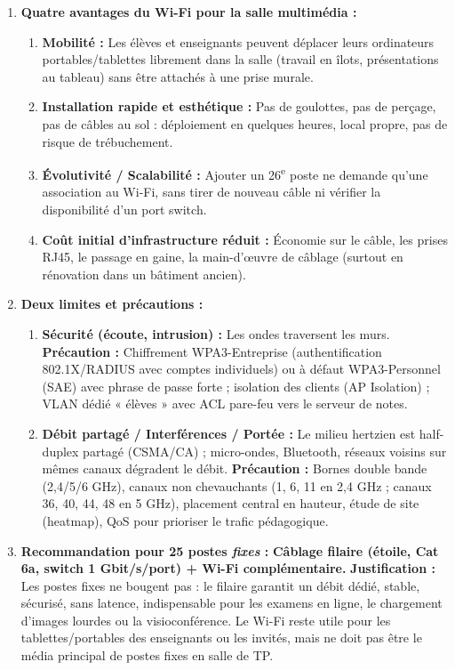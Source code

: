 \documentclass[11pt]{article}
\newcommand{\cle}[1]{{\popxbold\color{popdark}#1}}
\begin{document}
\begin{corrige}
\begin{enumerate}
  \item \textbf{Quatre avantages du Wi-Fi pour la salle multimédia :}
  \begin{enumerate}
    \item \textbf{Mobilité :} Les élèves et enseignants peuvent déplacer leurs ordinateurs portables/tablettes librement dans la salle (travail en îlots, présentations au tableau) sans être attachés à une prise murale.
    \item \textbf{Installation rapide et esthétique :} Pas de goulottes, pas de perçage, pas de câbles au sol : déploiement en quelques heures, local propre, pas de risque de trébuchement.
    \item \textbf{Évolutivité / Scalabilité :} Ajouter un 26\textsuperscript{e} poste ne demande qu'une association au Wi-Fi, sans tirer de nouveau câble ni vérifier la disponibilité d'un port switch.
    \item \textbf{Coût initial d'infrastructure réduit :} Économie sur le câble, les prises RJ45, le passage en gaine, la main-d'œuvre de câblage (surtout en rénovation dans un bâtiment ancien).
  \end{enumerate}
  \item \textbf{Deux limites et précautions :}
  \begin{enumerate}
    \item \textbf{Sécurité (écoute, intrusion) :} Les ondes traversent les murs. \textbf{Précaution :} Chiffrement \cle{WPA3-Entreprise} (authentification 802.1X/RADIUS avec comptes individuels) ou à défaut WPA3-Personnel (SAE) avec phrase de passe forte ; isolation des clients (AP Isolation) ; VLAN dédié « élèves » avec ACL pare-feu vers le serveur de notes.
    \item \textbf{Débit partagé / Interférences / Portée :} Le milieu hertzien est half-duplex partagé (CSMA/CA) ; micro-ondes, Bluetooth, réseaux voisins sur mêmes canaux dégradent le débit. \textbf{Précaution :} Bornes double bande (2,4/5/6 GHz), canaux non chevauchants (1, 6, 11 en 2,4 GHz ; canaux 36, 40, 44, 48 en 5 GHz), placement central en hauteur, étude de site (heatmap), QoS pour prioriser le trafic pédagogique.
  \end{enumerate}
  \item \textbf{Recommandation pour 25 postes \emph{fixes} :} \textbf{Câblage filaire (étoile, Cat 6a, switch 1 Gbit/s/port) + Wi-Fi complémentaire.}
  \textbf{Justification :} Les postes fixes ne bougent pas : le filaire garantit un débit dédié, stable, sécurisé, sans latence, indispensable pour les examens en ligne, le chargement d'images lourdes ou la visioconférence. Le Wi-Fi reste utile pour les tablettes/portables des enseignants ou les invités, mais ne doit pas être le média principal de postes fixes en salle de TP.
\end{enumerate}
\end{corrige}
\end{document}
